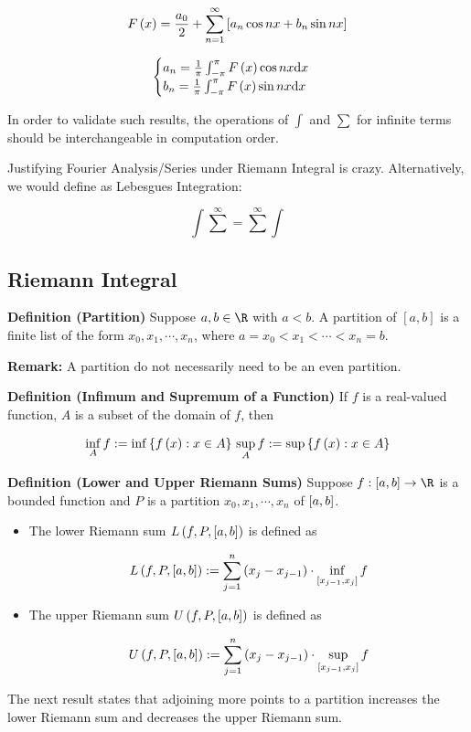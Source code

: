 \documentclass[
]{article}
\begin{document}
\[F\left(x\right) = \frac{a_0}2+\sum_{n = 1}^\infty\left[a_n\cos nx+b_n\sin nx\right]\]

\[\begin{cases}
a_n = \frac{1}{\pi}\int_{-\pi}^{\pi}F\left(x\right)\cos nx\text{d}x\\
b_n = \frac{1}{\pi}\int_{-\pi}^{\pi}F\left(x\right)\sin nx\text{d}x
\end{cases}\]

In order to validate such results, the operations of \(\int\) and
\(\sum\) for infinite terms should be interchangeable in computation
order.

Justifying Fourier Analysis/Series under Riemann Integral is crazy.
Alternatively, we would define as Lebesgue\textquotesingle s
Integration:

\[\int\sum^{\infty} = \sum^{\infty} \int\]

\hypertarget{riemann-integral}{%
\subsection{Riemann Integral}\label{riemann-integral}}

\textbf{Definition (Partition)} Suppose \(a,b\in \R\) with \(a<b\). A
partition of \([a,b]\) is a finite list of the form
\(x_0,x_1,\cdots,x_n\), where \(a = x_0 < x_1 < \cdots < x_n = b\).

\textbf{Remark:} A partition do not necessarily need to be an even
partition.

\textbf{Definition (Infimum and Supremum of a Function)} If \(f\) is a
real-valued function, \(A\) is a subset of the domain of \(f\), then

\[\inf_Af:=\inf\left\{f\left(x\right):x\in A\right\}\\
\sup_Af :=\sup \left\{f\left(x\right):x\in A\right\}\]

\textbf{Definition (Lower and Upper Riemann Sums)} Suppose
\(f:\br{a,b}\to \R\) is a bounded function and \(P\) is a partition
\(x_0,x_1,\cdots,x_n\) of \(\left[a,b\right]\).

\begin{itemize}
\item
  The lower Riemann sum \(L\left(f,P,\left[a,b\right]\right)\) is defined as

  \[L\left(f,P,\left[a,b\right]\right) := \sum_{j = 1}^n\left(x_j-x_{j-1}\right)\cdot \inf_{\left[x_{j-1},x_j\right]}f\]
\item
  The upper Riemann sum \(U\left(f,P,\left[a,b\right]\right)\) is defined as

  \[U\left(f,P,\left[a,b\right]\right) : = \sum_{j = 1}^n \left(x_j-x_{j-1}\right)\cdot \sup_{\left[x_{j-1},x_j\right]}f\]
\end{itemize}

The next result states that adjoining more points to a partition
increases the lower Riemann sum and decreases the upper Riemann sum.
\end{document}
